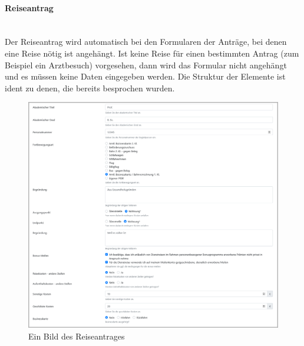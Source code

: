\paragraph{Reiseantrag}
~\\
Der Reiseantrag wird automatisch bei den Formularen der Anträge, bei denen eine Reise nötig ist angehängt. Ist keine Reise für einen bestimmten Antrag (zum Beispiel ein Arztbesuch) vorgesehen, dann wird das Formular nicht angehängt und es müssen keine  Daten eingegeben werden. Die Struktur der Elemente ist ident zu denen, die bereits besprochen wurden.
\begin{figure}[H]
	\centering
	\includegraphics[width=1\linewidth]{images/ldehner_implementierung/zusatz_1}
	\caption[Reiseantrag]{Ein Bild des Reiseantrages}
	\label{fig:zusatz1}
\end{figure}
\newpage

